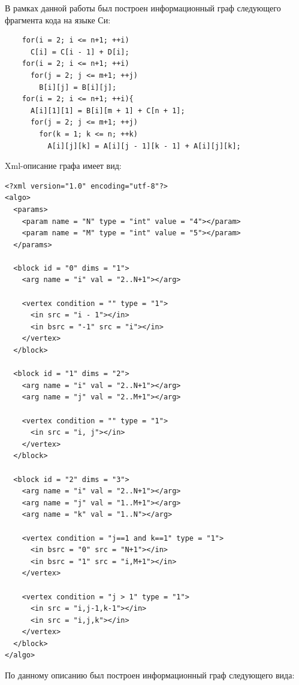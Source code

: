 \documentclass[a4paper, 12pt]{article}
\begin{document}
	В рамках данной работы был построен информационный граф следующего фрагмента кода на языке Си:
	
	\lstset{language=C}
	\begin{lstlisting}
	for(i = 2; i <= n+1; ++i)
	  C[i] = C[i - 1] + D[i];
	for(i = 2; i <= n+1; ++i)
	  for(j = 2; j <= m+1; ++j)
	    B[i][j] = B[i][j];
	for(i = 2; i <= n+1; ++i){
	  A[i][1][1] = B[i][m + 1] + C[n + 1];
	  for(j = 2; j <= m+1; ++j)
	    for(k = 1; k <= n; ++k)
	      A[i][j][k] = A[i][j - 1][k - 1] + A[i][j][k];
	\end{lstlisting}
	
	Xml-описание графа имеет вид:
	
	\lstset{language=xml}
	\begin{lstlisting}
<?xml version="1.0" encoding="utf-8"?>
<algo>
  <params>
    <param name = "N" type = "int" value = "4"></param>
    <param name = "M" type = "int" value = "5"></param>
  </params>

  <block id = "0" dims = "1">
    <arg name = "i" val = "2..N+1"></arg>

    <vertex condition = "" type = "1">
      <in src = "i - 1"></in>
      <in bsrc = "-1" src = "i"></in>
    </vertex>
  </block>

  <block id = "1" dims = "2">
    <arg name = "i" val = "2..N+1"></arg>
    <arg name = "j" val = "2..M+1"></arg>

    <vertex condition = "" type = "1">
      <in src = "i, j"></in>
    </vertex>
  </block>

  <block id = "2" dims = "3">
    <arg name = "i" val = "2..N+1"></arg>
    <arg name = "j" val = "1..M+1"></arg>
    <arg name = "k" val = "1..N"></arg>

    <vertex condition = "j==1 and k==1" type = "1">
      <in bsrc = "0" src = "N+1"></in>
      <in bsrc = "1" src = "i,M+1"></in>
    </vertex>

    <vertex condition = "j > 1" type = "1">
      <in src = "i,j-1,k-1"></in>
      <in src = "i,j,k"></in>
    </vertex>
  </block>
</algo>

	\end{lstlisting}
	
	По данному описанию был построен информационный граф следующего вида:
	
\end{document}
